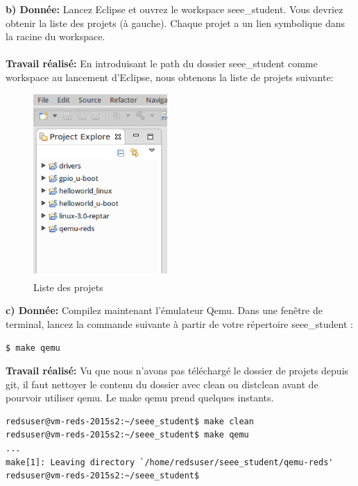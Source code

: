 \textbf{b) Donnée: }Lancez Eclipse et ouvrez le workspace seee\_student. Vous devriez obtenir la liste des projets (à
gauche). Chaque projet a un lien symbolique dans la racine du workspace. \\\\
\textbf{Travail réalisé: }
En introduisant le path du dossier seee\_student comme workspace au lancement d'Eclipse, nous obtenons la liste de projets suivante:
\begin{figure}[H]
	\begin{center}
		\includegraphics[height=7cm]{img/eclipseProjet.png}
		\caption{Liste des projets}
		\label{eclipseProjet}
	\end{center}
\end{figure}
\textbf{c) Donnée: }Compilez maintenant l'émulateur Qemu. Dans une fenêtre de terminal, lancez la commande
suivante à partir de votre répertoire seee\_student : 
\begin{lstlisting}
$ make qemu
\end{lstlisting}
\textbf{Travail réalisé: }
Vu que nous n'avons pas téléchargé le dossier de projets depuis git, il faut nettoyer le contenu du dossier avec clean ou distclean avant de pourvoir utiliser qemu. Le make qemu prend quelques instants.\\
\begin{lstlisting}
redsuser@vm-reds-2015s2:~/seee_student$ make clean
redsuser@vm-reds-2015s2:~/seee_student$ make qemu
...
make[1]: Leaving directory `/home/redsuser/seee_student/qemu-reds'
redsuser@vm-reds-2015s2:~/seee_student$
\end{lstlisting}
